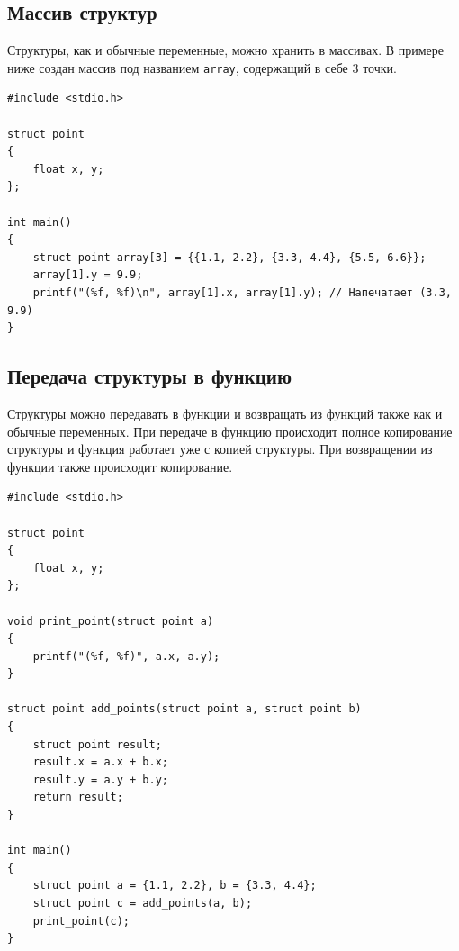 \documentclass{article}
\begin{document}
\subsection*{Массив структур}
Структуры, как и обычные переменные, можно хранить в массивах. В примере ниже создан массив под названием \texttt{array}, содержащий в себе 3 точки.
\begin{lstlisting}
#include <stdio.h>

struct point 
{
    float x, y;
};

int main() 
{
    struct point array[3] = {{1.1, 2.2}, {3.3, 4.4}, {5.5, 6.6}};
    array[1].y = 9.9;
    printf("(%f, %f)\n", array[1].x, array[1].y); // Напечатает (3.3, 9.9)
}
\end{lstlisting}

\subsection*{Передача структуры в функцию}
Структуры можно передавать в функции и возвращать из функций также как и обычные переменных. При передаче в функцию происходит полное копирование структуры и функция работает уже с копией структуры. При возвращении из функции также происходит копирование.
\begin{lstlisting}
#include <stdio.h>

struct point 
{
    float x, y;
};

void print_point(struct point a) 
{
    printf("(%f, %f)", a.x, a.y);
}

struct point add_points(struct point a, struct point b) 
{
    struct point result;
    result.x = a.x + b.x;
    result.y = a.y + b.y;
    return result;
}

int main() 
{
    struct point a = {1.1, 2.2}, b = {3.3, 4.4};
    struct point c = add_points(a, b);
    print_point(c);
}
\end{lstlisting}

\newpage
\end{document}
